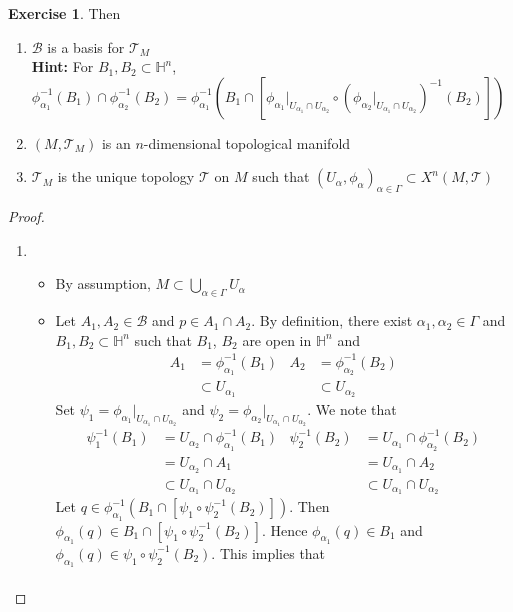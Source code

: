 \documentclass{book}
\theoremstyle{definition}
\newtheorem{ex}[definition]{Exercise}
\newcommand{\al}{\alpha}
\newcommand{\Gam}{\Gamma}
\renewcommand{\H}{\mathbb{H}}
\newcommand{\MB}{\mathcal{B}}
\newcommand{\MT}{\mathcal{T}}
\DeclareMathOperator*{\0}{\mbf{0}}
\DeclareMathOperator*{\1}{\mbf{1}}
\newcommand{\tbf}[1]{\textbf{#1}}
\begin{document}
\begin{ex}
	Then  
	\begin{enumerate}
		\item $\MB$ is a basis for $\MT_M$ \\
		\tbf{Hint:} For $B_1, B_2 \subset \H^n$, $\phi_{\al_1}^{-1}(B_1) \cap \phi_{\al_2}^{-1}(B_2) = \phi_{\al_1}^{-1}( B_1 \cap [\phi_{\al_1}|_{U_{\al_1} \cap U_{\al_2}} \circ (\phi_{\al_2}|_{U_{\al_1} \cap U_{\al_2}})^{-1}(B_2)])$
		\item $(M, \MT_M)$ is an $n$-dimensional topological manifold
		\item $\MT_M$ is the unique topology $\MT$ on $M$ such that $(U_{\al}, \phi_{\al})_{\al \in \Gam} \subset X^n(M, \MT)$
	\end{enumerate}
\end{ex}

\begin{proof} \
	\begin{enumerate}
		\item \begin{itemize}
			\item By assumption, $M \subset \bigcup\limits_{\al \in \Gam} U_{\al}$
			\item Let $A_1, A_2 \in \MB$ and $p \in A_1 \cap A_2$. By definition, there exist $\al_1, \al_2 \in \Gam$ and $B_1, B_2 \subset \H^n$ such that $B_1$, $B_2$ are open in $\H^n$ and 
			\begin{align*}
				A_1 & = \phi_{\al_1}^{-1}(B_1)  & A_2 & = \phi_{\al_2}^{-1}(B_2) \\
				& \subset U_{\al_1}         &     & \subset U_{\al_2}
			\end{align*}
			Set $\psi_1 = \phi_{\al_1}|_{U_{\al_1} \cap U_{\al_2}}$ and $\psi_2 = \phi_{\al_2}|_{U_{\al_1} \cap U_{\al_2}}$. We note that  
			\begin{align*}
				\psi_1^{-1}(B_1) & = U_{\al_2} \cap \phi_{\al_1}^{-1}(B_1) &  \psi_2^{-1}(B_2) & = U_{\al_1} \cap \phi_{\al_2}^{-1}(B_2) \\
				& = U_{\al_2} \cap A_1                    &                   & = U_{\al_1} \cap A_2 \\
				& \subset U_{\al_1} \cap U_{\al_2}        &                   & \subset U_{\al_1} \cap U_{\al_2}
			\end{align*}
			Let $q \in \phi_{\al_1}^{-1}(B_1 \cap [\psi_1 \circ \psi_2^{-1}(B_2)])$. Then $\phi_{\al_1}(q) \in B_1 \cap [\psi_1 \circ \psi_2^{-1}(B_2)]$. Hence $\phi_{\al_1}(q) \in B_1$ and $\phi_{\al_1}(q) \in \psi_1 \circ \psi_2^{-1}(B_2)$. This implies that  
			\begin{align*}

\end{align*}
\end{itemize}
\end{enumerate}
\end{proof}
\end{document}
